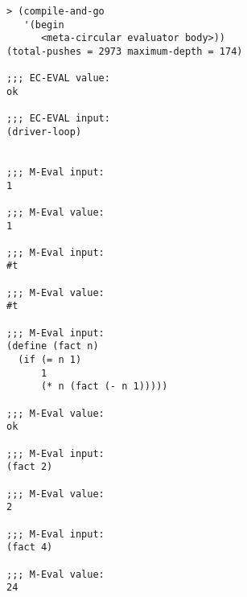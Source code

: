 \documentclass[a4paper,12pt]{article}
\begin{document}
\begin{lstlisting}
> (compile-and-go
   '(begin
      <meta-circular evaluator body>))
(total-pushes = 2973 maximum-depth = 174)

;;; EC-EVAL value:
ok

;;; EC-EVAL input:
(driver-loop)


;;; M-Eval input:
1

;;; M-Eval value:
1

;;; M-Eval input:
#t

;;; M-Eval value:
#t

;;; M-Eval input:
(define (fact n)
  (if (= n 1)
      1
      (* n (fact (- n 1)))))

;;; M-Eval value:
ok

;;; M-Eval input:
(fact 2)

;;; M-Eval value:
2

;;; M-Eval input:
(fact 4)

;;; M-Eval value:
24
\end{lstlisting}
\end{document}
